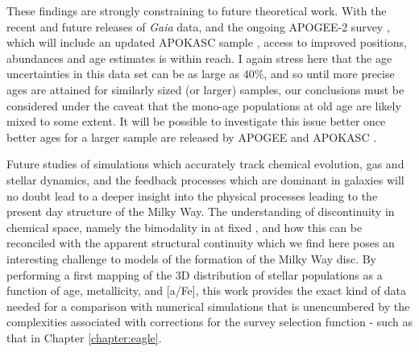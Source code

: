  These findings are strongly constraining to future theoretical work. With the recent \citep{2016arXiv160904303L} and future releases of \emph{Gaia} data, and the ongoing APOGEE-2 survey \citep{2014AAS...22344006S}, which will include an updated APOKASC sample \citep{2014ApJS..215...19P}, access to improved positions, abundances and age estimates is within reach. I again stress here that the age uncertainties in this data set can be as large as $40\%$, and so until more precise ages are attained for similarly sized (or larger) samples, our conclusions must be considered under the caveat that the mono-age populations at old age are likely mixed to some extent. It will be possible to investigate this issue better once better ages for a larger sample are released by APOGEE and APOKASC \citep{2014ApJS..215...19P}.

Future studies of simulations which accurately track chemical evolution, gas and stellar dynamics, and the feedback processes which are dominant in galaxies will no doubt lead to a deeper insight into the physical processes leading to the present day structure of the Milky Way. The understanding of discontinuity in chemical space, namely the bimodality in \afe{} at fixed \feh{}, and how this can be reconciled with the apparent structural continuity which we find here poses an interesting challenge to models of the formation of the Milky Way disc. By performing a first mapping of the 3D distribution of stellar populations as a function of age, metallicity, and [a/Fe], this work provides the exact kind of data needed for a comparison with numerical simulations that is unencumbered by the complexities associated with corrections for the survey selection function - such as that in Chapter \ref{chapter:eagle}.





